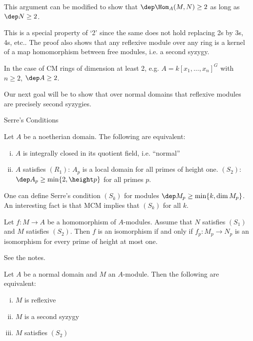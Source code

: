 This argument can be modified to show that $\dep \Hom_A(M,N) \geq 2$ as long as $\dep N \geq 2$. 


\begin{rem}
This is a special property of `2' since the same does not hold replacing 2s by 3s, 4s, etc.. The proof also shows that any reflexive module over any ring is a kernel of a map homomorphism between free modules, i.e. a second syzygy. 
\end{rem}


\begin{ex}
In the case of CM rings of dimension at least 2, e.g. $A= k[x_1,\ldots,x_n]^G$ with $n \geq 2$, $\dep A \geq 2$. 
\end{ex}

 
 Our next goal will be to show that over normal domains that reflexive modules are precisely second syzygies. 



Serre's Conditions 

\begin{thm}[Serre]
Let $A$ be a noetherian domain. The following are equivalent:
	\begin{enumerate}[(i)]
	\item $A$ is integrally closed in its quotient field, i.e. ``normal''
	\item $A$ satisfies $(R_1)$: $A_p$ is a local domain for all primes of height one. $(S_2)$: $\dep A_p \geq \min\{2, \height p\}$ for all primes $p$. 
	\end{enumerate}
\end{thm}


One can define Serre's condition $(S_k)$ for modules $\dep M_p \geq \min\{k,\dim M_p\}$. An interesting fact is that MCM implies that $(S_k)$ for all $k$. 


\begin{lem} \label{lem:lemhelpful}
Let $f: M \to A$ be a homomorphism of $A$-modules. Assume that $N$ satisfies $(S_1)$ and $M$ satisfies $(S_2)$. Then $f$ is an isomorphism if and only if $f_p: M_p \to N_p$ is an isomorphism for every prime of height at most one. 
\end{lem}


\pf See the notes.


\begin{prop}
Let $A$ be a normal domain and $M$ an $A$-module. Then the following are equivalent:
	\begin{enumerate}[(i)]
	\item $M$ is reflexive
	\item $M$ is a second syzygy
	\item $M$ satisfies $(S_2)$
	\end{enumerate}
\end{prop}



